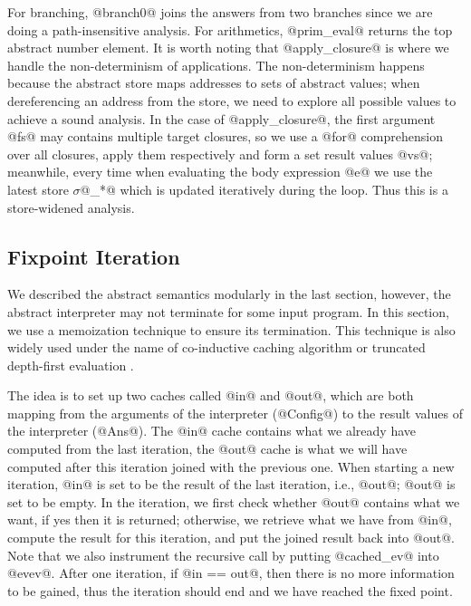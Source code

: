 For branching, @branch0@ joins the answers from two branches since we are doing a path-insensitive analysis. 
For arithmetics, @prim_eval@ returns the top abstract number element.
It is worth noting that @apply_closure@ is where we handle the non-determinism of applications.
The non-determinism happens because the abstract store maps addresses to sets of abstract values;
when dereferencing an address from the store, we need to explore all possible values to achieve a sound 
analysis. In the case of @apply_closure@, the first argument @fs@ may contains multiple target closures,
so we use a @for@ comprehension over all closures, apply them respectively and form a set result values @vs@;
meanwhile, every time when evaluating the body expression @e@ we use the latest store $\sigma$@_*@
which is updated iteratively during the loop. Thus this is a store-widened analysis.

\subsection{Fixpoint Iteration}
We described the abstract semantics modularly in the last section, however, the abstract 
interpreter may not terminate for some input program. In this section, we use a memoization
technique to ensure its termination. This technique is also widely used under the name of co-inductive caching algorithm
\cite{DBLP:journals/pacmpl/DaraisLNH17, Wei:2018:RAA:3243631.3236800} or truncated depth-first evaluation 
\cite{Rosendahl:AbsIntPL}.

The idea is to set up two caches called @in@ and @out@, which are both mapping from the arguments of the interpreter 
(@Config@) to the result values of the interpreter (@Ans@). The @in@ cache contains what we already have 
computed from the last
iteration, the @out@ cache is what we will have computed after this iteration joined with the previous one.
When starting a new iteration, @in@ is set to be the result of the last iteration, i.e., @out@; @out@ is set
to be empty. In the iteration, we first check whether @out@ contains what we want, if yes then it is returned;
otherwise, we retrieve what we have from @in@, compute the result for this iteration, 
and put the joined result back into @out@.
Note that we also instrument the recursive call by putting @cached_ev@ into @evev@.
After one iteration, if @in == out@, then there is no more information to be gained, thus the iteration should 
end and we have reached the fixed point.

